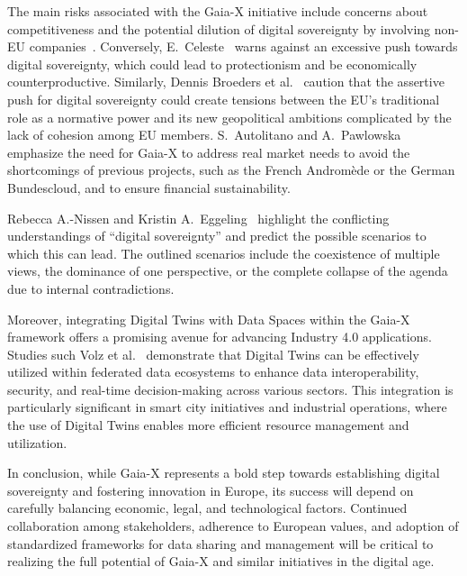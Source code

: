 The main risks associated with the Gaia-X initiative include concerns about competitiveness and the potential dilution of digital sovereignty by involving non-EU companies~\cite{europe_quest_for_digital_sovereignty}.
Conversely, E.~Celeste~\cite{dig_sovereignty_challenges} warns against an excessive push towards digital sovereignty, which could lead to protectionism and be economically counterproductive.
Similarly, Dennis Broeders et al.~\cite{digital_sovereignty_and_strategic_autonomy} caution that the assertive push for digital sovereignty could create tensions between the EU's traditional role as a normative power and its new geopolitical ambitions complicated by the lack of cohesion among EU members.
S.~Autolitano and A.~Pawlowska~\cite{europe_quest_for_digital_sovereignty} emphasize the need for Gaia-X to address real market needs to avoid the shortcomings of previous projects, such as the French Andromède or the German Bundescloud, and to ensure financial sustainability.

Rebecca A.-Nissen and Kristin A.~Eggeling~\cite{discursive_struggle_for_digital_sovereignty} highlight the conflicting understandings of ``digital sovereignty'' and predict the possible scenarios to which this can lead.
The outlined scenarios include the coexistence of multiple views, the dominance of one perspective, or the complete collapse of the agenda due to internal contradictions.

Moreover, integrating Digital Twins with Data Spaces within the Gaia-X framework offers a promising avenue for advancing Industry 4.0 applications.
Studies such Volz et al.~\cite{role_of_digital_twins_in_data_spaces} demonstrate that Digital Twins can be effectively utilized within federated data ecosystems to enhance data interoperability, security, and real-time decision-making across various sectors.
This integration is particularly significant in smart city initiatives and industrial operations, where the use of Digital Twins enables more efficient resource management and utilization.

In conclusion, while Gaia-X represents a bold step towards establishing digital sovereignty and fostering innovation in Europe, its success will depend on carefully balancing economic, legal, and technological factors.
Continued collaboration among stakeholders, adherence to European values, and adoption of standardized frameworks for data sharing and management will be critical to realizing the full potential of Gaia-X and similar initiatives in the digital age.
